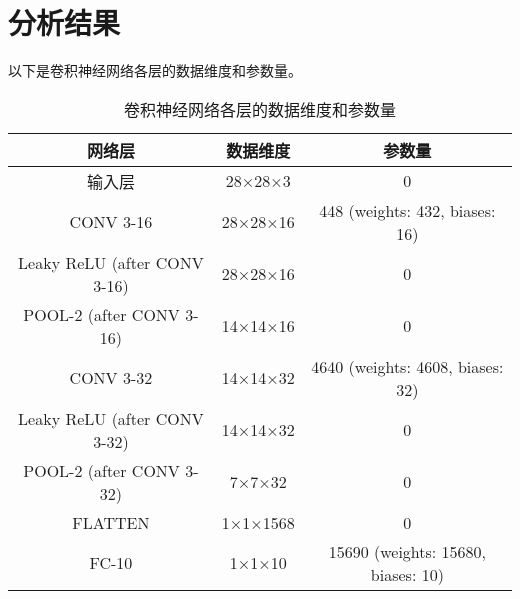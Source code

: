 \section{分析结果}\label{sec:results}

以下是卷积神经网络各层的数据维度和参数量。

\begin{table}[!hpt]
  \caption{卷积神经网络各层的数据维度和参数量}
  \centering
  \begin{tabular}{ccc} \toprule
    \textbf{网络层} & \textbf{数据维度} & \textbf{参数量} \\ \midrule
    输入层 & 28×28×3 & 0 \\
    CONV 3-16 & 28×28×16 & 448 (weights: 432, biases: 16) \\
    Leaky ReLU (after CONV 3-16) & 28×28×16 & 0 \\
    POOL-2 (after CONV 3-16) & 14×14×16 & 0 \\
    CONV 3-32 & 14×14×32 & 4640 (weights: 4608, biases: 32) \\
    Leaky ReLU (after CONV 3-32) & 14×14×32 & 0 \\
    POOL-2 (after CONV 3-32) & 7×7×32 & 0 \\
    FLATTEN & 1×1×1568 & 0 \\
    FC-10 & 1×1×10 & 15690 (weights: 15680, biases: 10) \\ \bottomrule
  \end{tabular}
\end{table}